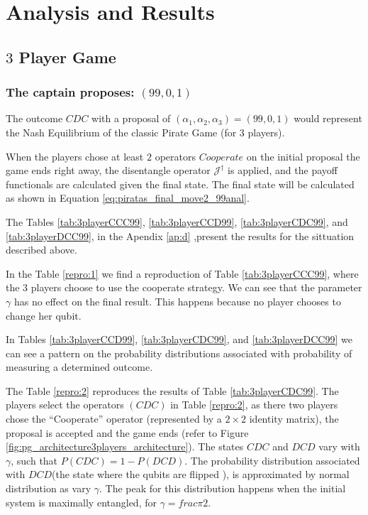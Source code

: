 \section{Analysis and Results}
\label{sec:description_3}


\subsection{$3$ Player Game}
\label{subsec:3playergame}

\subsubsection{The captain proposes: $(99, 0, 1)$}
\label{subsubsec:3playergame99}

The outcome $CDC$ with a proposal of $(\alpha_{1}, \alpha_{2}, \alpha_{3}) =(99, 0, 1)$ would represent the Nash Equilibrium of the classic Pirate Game (for $3$ players). 

When the players chose at least $2$ operators $Cooperate$ on the initial proposal the game ends right away, the disentangle operator $\mathcal{J}^{\dagger}$ is applied, and the payoff functionals are calculated given the final state. The final state will be calculated as shown in Equation \ref{eq:piratas_final_move2_99anal}. 

The Tables \ref{tab:3playerCCC99}, \ref{tab:3playerCCD99}, \ref{tab:3playerCDC99}, and \ref{tab:3playerDCC99}, in the Apendix \ref{ap:d}
,present the results for the sittuation described above.

In the Table \ref{repro:1} we find a reproduction of Table \ref{tab:3playerCCC99}, where the $3$ players choose to use the cooperate strategy. We can see that the parameter $\gamma$ has no effect on the final result. This happens because no player chooses to change her qubit. 

In Tables \ref{tab:3playerCCD99}, \ref{tab:3playerCDC99}, and \ref{tab:3playerDCC99} we can see a pattern on the probability distributions 
associated with probability of measuring a determined outcome. 

The Table \ref{repro:2} reproduces the results of Table \ref{tab:3playerCDC99}. 
The players select the operators $(CDC)$ in Table \ref{repro:2}, as there two players chose the ``Cooperate'' operator (represented by a $2 \times 2$ identity matrix), the proposal is accepted and the game ends (refer to Figure \ref{fig:pg_architecture3players_architecture}). The states $CDC$ and $DCD$ vary with $\gamma$, such that $P(CDC)= 1 - P(DCD)$. The probability distribution associated with $DCD$(the state where the qubits are flipped ), is approximated by normal distribution as vary $\gamma$. The peak for this distribution happens when the initial system is maximally entangled, for $\gamma=frac{\pi}{2}$.

